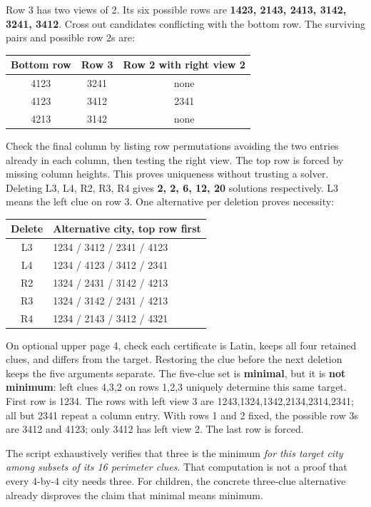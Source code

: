 \documentclass[11pt]{article}
\begin{document}
Row 3 has two views of 2. Its six possible rows are \textbf{1423, 2143, 2413, 3142, 3241, 3412}. Cross out candidates conflicting with the bottom row. The surviving pairs and possible row 2s are:
\begin{center}\renewcommand{\arraystretch}{1.3}\begin{tabular}{c|c|c}Bottom row&Row 3&Row 2 with right view 2\\\hline4123&3241&none\\4123&3412&2341\\4213&3142&none\end{tabular}\end{center}
Check the final column by listing row permutations avoiding the two entries already in each column, then testing the right view. The top row is forced by missing column heights. This proves uniqueness without trusting a solver.
Deleting L3, L4, R2, R3, R4 gives \textbf{2, 2, 6, 12, 20} solutions respectively. L3 means the left clue on row 3. One alternative per deletion proves necessity:
\begin{center}\small\renewcommand{\arraystretch}{1.35}\begin{tabular}{c|l}Delete&Alternative city, top row first\\\hline L3&1234 / 3412 / 2341 / 4123\\L4&1234 / 4123 / 3412 / 2341\\R2&1324 / 2431 / 3142 / 4213\\R3&1324 / 3142 / 2431 / 4213\\R4&1234 / 2143 / 3412 / 4321\end{tabular}\end{center}
On optional upper page 4, check each certificate is Latin, keeps all four retained clues, and differs from the target. Restoring the clue before the next deletion keeps the five arguments separate. The five-clue set is \textbf{minimal}, but it is \textbf{not minimum}: left clues 4,3,2 on rows 1,2,3 uniquely determine this same target. First row is 1234. The rows with left view 3 are 1243,1324,1342,2134,2314,2341; all but 2341 repeat a column entry. With rows 1 and 2 fixed, the possible row 3s are 3412 and 4123; only 3412 has left view 2. The last row is forced.

The script exhaustively verifies that three is the minimum \emph{for this target city among subsets of its 16 perimeter clues}. That computation is not a proof that every 4-by-4 city needs three. For children, the concrete three-clue alternative already disproves the claim that minimal means minimum.
\end{document}
